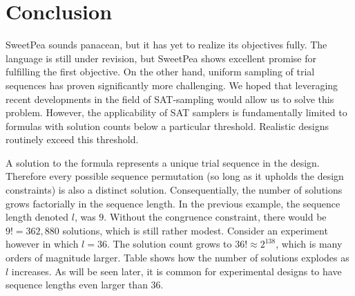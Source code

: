 \section{Conclusion}

SweetPea sounds panacean, but it has yet to realize its objectives fully. The language is still under revision, but SweetPea shows excellent promise for fulfilling the first objective. On the other hand, uniform sampling of trial sequences has proven significantly more challenging. We hoped that leveraging recent developments in the field of SAT-sampling would allow us to solve this problem. However, the applicability of SAT samplers is fundamentally limited to formulas with solution counts below a particular threshold. Realistic designs routinely exceed this threshold.

A solution to the formula represents a unique trial sequence in the design. Therefore every possible sequence permutation (so long as it upholds the design constraints) is also a distinct solution. Consequentially, the number of solutions grows factorially in the sequence length. In the previous example, the sequence length denoted $l$, was $9$. Without the congruence constraint, there would be $9! = 362,880$ solutions, which is still rather modest. Consider an experiment however in which $l = 36$. The solution count grows to $36! \approx 2^{138}$, which is many orders of magnitude larger. Table \cite{tab:factorial_explosion} shows how the number of solutions explodes as $l$ increases. As will be seen later, it is common for experimental designs to have sequence lengths even larger than 36.

